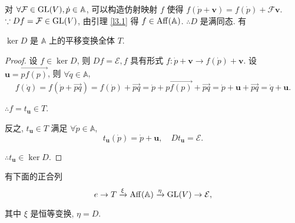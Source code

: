 \documentclass{ctexart}
\begin{document}
对 $\forall\mathcal{F}\in\operatorname{GL} (V),\dot{p}\in\mathbb{A}$, 可以构造仿射映射 $f$ 使得 $f(\dot{p}+\boldsymbol{v})=f(\dot{p})+\mathcal{F}\boldsymbol{v}$. $\because Df=\mathcal{F}\in\operatorname{GL} (V)$, 由引理 \ref{l3.1} 得 $f\in\operatorname{Aff} (\mathbb{A})$. $\therefore D$ 是满同态. 有
\begin{lemma}
    $\ker D$ 是 $\mathbb{A}$ 上的平移变换全体 $T$.
\end{lemma}
\begin{proof}
    设 $f\in\ker D$, 则 $Df=\mathcal{E},f$ 具有形式 $f:\dot{p}+\boldsymbol{v}\to f(\dot{p})+\boldsymbol{v}$. 设 $\boldsymbol{u}=\overrightarrow{pf(p)}$, 则 $\forall\dot{q}\in\mathbb{A}$,
    \[f(\dot{q})=f(\dot{p}+\overrightarrow{pq})=f(\dot{p})+\overrightarrow{pq}=\dot{p}+\overrightarrow{pf(p)}+\overrightarrow{pq}=\dot{p}+\boldsymbol{u}+\overrightarrow{pq}=\dot{q}+\boldsymbol{u}.\]

    $\therefore f=t_{\boldsymbol{u}}\in T$.

    反之, $t_{\boldsymbol{u}}\in T$ 满足 $\forall\dot{p}\in\mathbb{A}$,
    \[t_{\boldsymbol{u}}(\dot{p})=\dot{p}+\boldsymbol{u},\quad Dt_{\boldsymbol{u}}=\mathcal{E}.\]

    $\therefore t_{\boldsymbol{u}}\in\ker D$.
\end{proof}
有下面的正合列
\begin{equation}\label{eq3.1}
    e\to T\xrightarrow{\xi}\operatorname{Aff} (\mathbb{A})\xrightarrow{\eta}\operatorname{GL} (V)\to\mathcal{E},
\end{equation}

其中 $\xi$ 是恒等变换, $\eta=D$.
\end{document}
